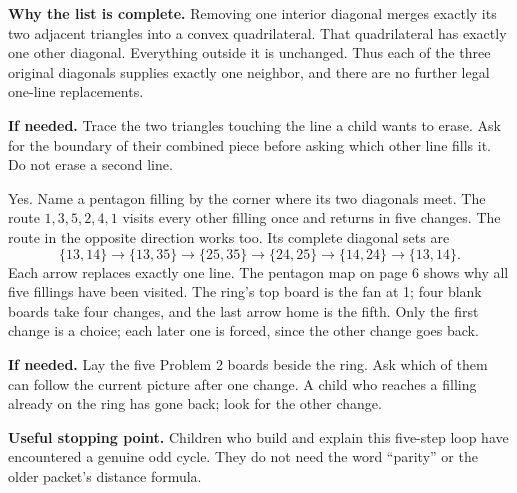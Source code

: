 \documentclass[11pt,letterpaper]{article}
\newcommand{\prob}[2]{\par\vspace{5pt}{\large\bfseries #1}\par #2}
\newcommand{\hint}[1]{\par\textbf{If needed.} #1\par}
\begin{document}
\textbf{Why the list is complete.} Removing one interior diagonal merges exactly its two adjacent triangles into a convex quadrilateral. That quadrilateral has exactly one other diagonal. Everything outside it is unchanged. Thus each of the three original diagonals supplies exactly one neighbor, and there are no further legal one-line replacements.
\hint{Trace the two triangles touching the line a child wants to erase. Ask for the boundary of their combined piece before asking which other line fills it. Do not erase a second line.}
\prob{Problem 6}{Yes. Name a pentagon filling by the corner where its two diagonals meet. The route $1,3,5,2,4,1$ visits every other filling once and returns in five changes. The route in the opposite direction works too. Its complete diagonal sets are}
\[
\{13,14\}\to\{13,35\}\to\{25,35\}\to
\{24,25\}\to\{14,24\}\to\{13,14\}.
\]
Each arrow replaces exactly one line. The pentagon map on page 6 shows why all five fillings have been visited. The ring's top board is the fan at 1; four blank boards take four changes, and the last arrow home is the fifth. Only the first change is a choice; each later one is forced, since the other change goes back.
\hint{Lay the five Problem 2 boards beside the ring. Ask which of them can follow the current picture after one change. A child who reaches a filling already on the ring has gone back; look for the other change.}
\textbf{Useful stopping point.} Children who build and explain this five-step loop have encountered a genuine odd cycle. They do not need the word ``parity'' or the older packet's distance formula.
\end{document}
